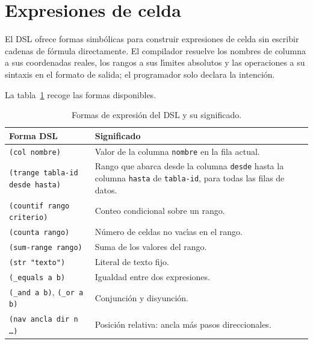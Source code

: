 \section{Expresiones de celda}
\label{sec:expresiones-dsl}

El DSL ofrece formas simb\'olicas para construir expresiones de celda sin
escribir cadenas de f\'ormula directamente.  El compilador resuelve los
nombres de columna a sus coordenadas reales, los rangos a sus l\'{\i}mites
absolutos y las operaciones a su sintaxis en el formato de salida; el
programador solo declara la intenci\'on.

La tabla~\ref{tab:formas-expresion} recoge las formas disponibles.

\begin{table}[h!]
\centering
\caption{Formas de expresi\'on del DSL y su significado.}
\label{tab:formas-expresion}
\renewcommand{\arraystretch}{1.3}
\begin{tabular}{p{5.5cm} p{8.3cm}}
\toprule
\textbf{Forma DSL} & \textbf{Significado} \\
\midrule
\texttt{(col nombre)}
  & Valor de la columna \texttt{nombre} en la fila actual. \\
\midrule
\texttt{(trange tabla-id desde hasta)}
  & Rango que abarca desde la columna \texttt{desde} hasta la
    columna \texttt{hasta} de \texttt{tabla-id}, para todas
    las filas de datos. \\
\midrule
\texttt{(countif rango criterio)}
  & Conteo condicional sobre un rango. \\
\midrule
\texttt{(counta rango)}
  & N\'umero de celdas no vac\'{\i}as en el rango. \\
\midrule
\texttt{(sum-range rango)}
  & Suma de los valores del rango. \\
\midrule
\texttt{(str "texto")}
  & Literal de texto fijo. \\
\midrule
\texttt{(\_equals a b)}
  & Igualdad entre dos expresiones. \\
\midrule
\texttt{(\_and a b)}, \texttt{(\_or a b)}
  & Conjunci\'on y disyunci\'on. \\
\midrule
\texttt{(nav ancla dir n \ldots)}
  & Posici\'on relativa: ancla m\'as pasos direccionales. \\
\bottomrule
\end{tabular}
\end{table}

